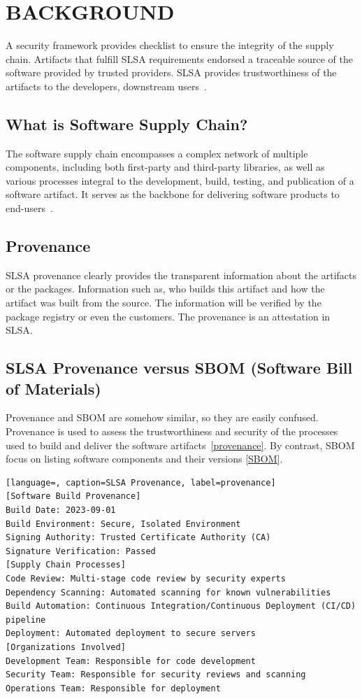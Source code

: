 \section{BACKGROUND}
A security framework provides checklist to ensure the integrity of the supply chain.
Artifacts that fulfill SLSA requirements endorsed a traceable source of the software provided
by trusted providers. SLSA provides trustworthiness of the artifacts to the developers, downstream users~\cite{slsa2023}. 

\subsection{What is Software Supply Chain?}
The software supply chain encompasses a complex network of multiple components, including both first-party and third-party libraries, 
as well as various processes integral to the development, build, testing, and publication of a software artifact. 
It serves as the backbone for delivering software products to end-users~\cite{DoDDefCI/CD2023}.

\subsection{Provenance}
SLSA provenance clearly provides the transparent information about the artifacts or the packages.
Information such as, who builds this artifact and how the artifact was built from the source.
The information will be verified by the package registry or even the customers. The provenance
is an attestation in SLSA.

\subsection{SLSA Provenance versus SBOM (Software Bill of Materials)}
Provenance and SBOM are somehow similar, so they are easily confused. Provenance is used to 
assess the trustworthiness and security of the processes used to build and deliver the software artifacts~\ref{provenance}.
By contrast, SBOM focus on listing software components and their versions \ref{SBOM}.

\begin{lstlisting}[language=, caption=SLSA Provenance, label=provenance]
[Software Build Provenance]
Build Date: 2023-09-01
Build Environment: Secure, Isolated Environment
Signing Authority: Trusted Certificate Authority (CA)
Signature Verification: Passed
[Supply Chain Processes]
Code Review: Multi-stage code review by security experts
Dependency Scanning: Automated scanning for known vulnerabilities
Build Automation: Continuous Integration/Continuous Deployment (CI/CD) pipeline
Deployment: Automated deployment to secure servers
[Organizations Involved]
Development Team: Responsible for code development
Security Team: Responsible for security reviews and scanning
Operations Team: Responsible for deployment
\end{lstlisting}

